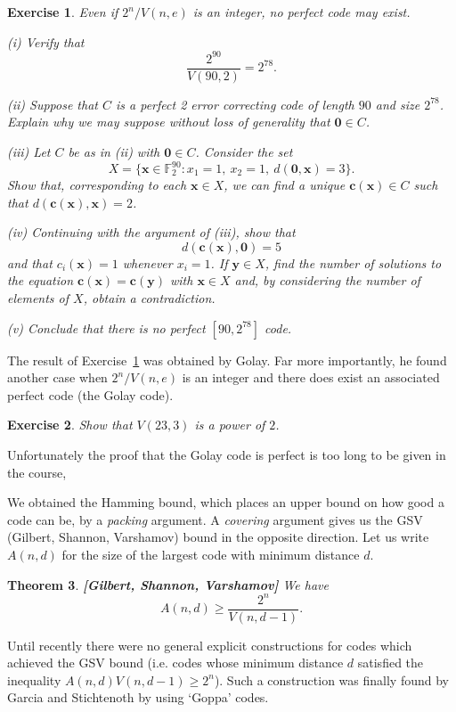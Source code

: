 \documentclass[12pt,a4paper]{article}
\theoremstyle{plain}
\newtheorem{theorem}{Theorem}[section]
\newtheorem{exercise}[theorem]{Exercise}
\theoremstyle{definition}
\begin{document}
    \begin{exercise}
        \label{Not perfect}
        Even if $2^{n}/V(n,e)$ is an integer,
        no perfect code may exist.

        (i) Verify that
        \[\frac{2^{90}}{V(90,2)}=2^{78}.\]

        (ii) Suppose that $C$ is a perfect 2 error correcting
        code of length $90$ and size $2^{78}$. Explain
        why we may suppose without loss of generality
        that ${\boldsymbol 0}\in C$.

        (iii) Let $C$ be as in (ii) with ${\boldsymbol 0}\in C$.
        Consider the set
        \[X=\{{\mathbf x}\in{\mathbb F}_{2}^{90}:
        x_{1}=1,\ x_{2}=1,\ d({\boldsymbol 0},{\mathbf x})=3\}.\]
        Show that, corresponding to each ${\mathbf x}\in X$,
        we can find a unique ${\mathbf c}({\mathbf x})\in C$
        such that $d({\mathbf c}({\mathbf x}),{\mathbf x})=2$.

        (iv) Continuing with the argument of (iii), show
        that
        \[d({\mathbf c}({\mathbf x}),{\boldsymbol 0})=5\]
        and that $c_{i}({\mathbf x})=1$ whenever $x_{i}=1$.
        If  $\mathbf{y}\in X$,
        find the number of solutions to the equation
        ${\mathbf c}({\mathbf x})={\mathbf c}({\mathbf y})$
        with $\mathbf{x}\in X$
        and, by considering the number of elements of $X$,
        obtain a contradiction.

        (v) Conclude that there is no perfect $[90,2^{78}]$ code.
    \end{exercise}
    The result of Exercise~\ref{Not perfect} was obtained by
    Golay. Far more importantly, he found another case
    when $2^{n}/V(n,e)$ is an integer and there
    does exist an associated perfect code (the Golay code).
    \begin{exercise}
        \label{Golay perfect}
        Show that $V(23,3)$ is a power of $2$.
    \end{exercise}
    Unfortunately the proof that the Golay code is perfect is
    too long to be given in the course,


    We obtained the Hamming bound, which
    places an upper bound on how good
    a code can be, by a \emph{packing} argument.
    A \emph{covering} argument gives
    us the GSV (Gilbert, Shannon, Varshamov) bound
    in the opposite direction. Let us write
    $A(n,d)$ for the size of the largest code
    with minimum distance $d$.
    \begin{theorem} {\bf [Gilbert, Shannon, Varshamov]}
        \label{GSV}
        We have
        \[A(n,d)\geq \frac{2^{n}}{V(n,d-1)}.\]
    \end{theorem}
    Until recently there were no general explicit
    constructions for codes which achieved the
    GSV bound (i.e. codes whose minimum distance
    $d$ satisfied the inequality $A(n,d)V(n,d-1)\geq 2^{n}$).
    Such a construction
    was finally found by Garcia and Stichtenoth by
    using `Goppa' codes.
\end{document}
